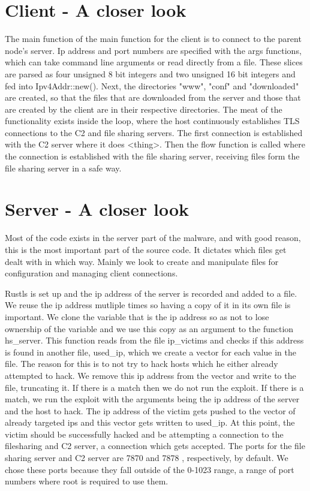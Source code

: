 \documentclass[../main.tex]{subfiles}
\begin{document}
	\section{Client - A closer look}


The main function of the main function for the client is to connect to the parent node's server. Ip address and port numbers are specified with the args functions, which can take
command line arguments or read directly from a file. These slices are parsed as four unsigned 8 bit integers and two unsigned 16 bit integers and fed into Ipv4Addr::new().
Next, the directories "www", "conf" and "downloaded" are created, so that the files that are downloaded from the server and those that are created by the client are in their respective
directories. The meat of the functionality exists inside the loop, where the host continuously establishes TLS connections to the C2 and file sharing servers. The first connection is 
established with the C2 server where it does <thing>. Then the flow function is called where the connection is established with the file sharing server, receiving files form the file
sharing server in a safe way.
	\vspace{10pt}

	\section{Server -  A closer look}


Most of the code exists in the server part of the malware, and with good reason, this is the most important part of the source code. It dictates which files get dealt with in which way.
Mainly we look to create and manipulate files for configuration and managing client connections.

Rustls is set up and the ip address of the server is recorded and added to a file. We reuse the ip address mutliple times so having a copy of it in its own file is important. We clone
the variable that is the ip address so as not to lose ownership of the variable and we use this copy as an argument to the function hs_server. This function reads from the file 
ip_victims and checks if this address is found in another file, used_ip, which we create a vector for each value in the file. The reason for this is to not try to hack hosts which 
he either already attempted to hack. We remove this ip address from the vector and write to the file, truncating it. If there is a match then we do not run the exploit. If there is a
match, we run the exploit with the arguments being the ip address of the server and the host to hack. The ip address of the victim gets pushed to the vector of already targeted ips and
this vector gets written to used_ip. At this point, the victim should be successfully hacked and be attempting a connection to the filesharing and C2 server, a connection which 
gets accepted. The ports for the file sharing server and C2 server are 7870 and 7878 , respectively, by default. We chose these ports because they fall outside of the 0-1023 range,
a range of port numbers where root is required to use them.

	\vspace{10pt}
\end{document}
